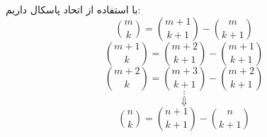 با استفاده از اتحاد پاسکال داریم:
 \p
$$\binom{m}{k} = \binom{m + 1}{k + 1} - \binom{m}{k + 1}$$
$$\binom{m + 1}{k} = \binom{m + 2}{k + 1} - \binom{m + 1}{k + 1}$$
$$\binom{m + 2}{k} = \binom{m + 3}{k + 1} - \binom{m + 2}{k + 1}$$
$$\vdots$$
$$\Downarrow$$
$$\binom{n}{k} = \binom{n + 1}{k + 1} - \binom{n}{k + 1}$$